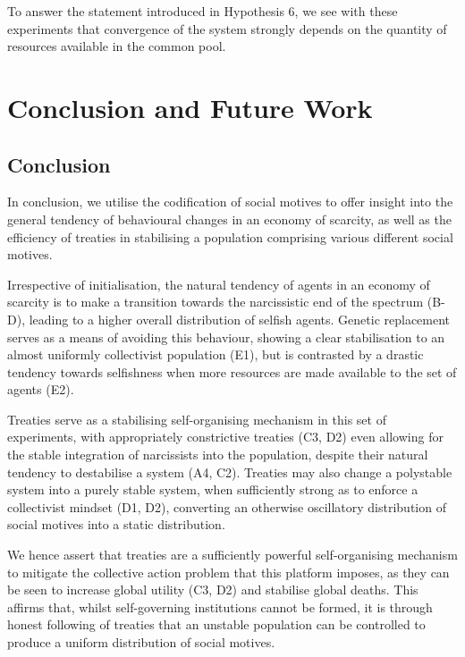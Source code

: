 To answer the statement introduced in Hypothesis 6, we see with these experiments that convergence of the system strongly depends on the quantity of resources available in the common pool.

 
\section{Conclusion and Future Work}\label{conclusion_future_work}

\subsection{Conclusion}

In conclusion, we utilise the codification of social motives to offer insight into the general tendency of behavioural changes in an economy of scarcity, as well as the efficiency of treaties in stabilising a population comprising various different social motives. 

Irrespective of initialisation, the natural tendency of agents in an economy of scarcity is to make a transition towards the narcissistic end of the spectrum (B-D), leading to a higher overall distribution of selfish agents. Genetic replacement serves as a means of avoiding this behaviour, showing a clear stabilisation to an almost uniformly collectivist population (E1), but is contrasted by a drastic tendency towards selfishness when more resources are made available to the set of agents (E2).

Treaties serve as a stabilising self-organising mechanism in this set of experiments, with appropriately constrictive treaties (C3, D2) even allowing for the stable integration of narcissists into the population, despite their natural tendency to destabilise a system (A4, C2). Treaties may also change a polystable system into a purely stable system, when sufficiently strong as to enforce a collectivist mindset (D1, D2), converting an otherwise oscillatory distribution of social motives into a static distribution.

We hence assert that treaties are a sufficiently powerful self-organising mechanism to mitigate the collective action problem that this platform imposes, as they can be seen to increase global utility (C3, D2) and stabilise global deaths. This affirms that, whilst self-governing institutions cannot be formed, it is through honest following of treaties that an unstable population can be controlled to produce a uniform distribution of social motives.
 
